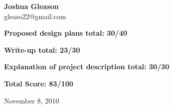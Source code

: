 \begin{titlepage}
\begin{center}



  \vspace*{0.2\textheight}

  { \large \bfseries Joshua Gleason}\\
  { \large gleaso22@gmail.com}\\

\vspace*{\fill}

{\bf Proposed design plans total: 30/40}

\hspace{20pt}

{\bf Write-up total:  23/30}

\vspace{20pt}

{\bf Explanation of project description total: 30/30}

\vspace{20pt}

{\bf {\LARGE Total Score: 83/100}}
  
\vspace*{\fill}

{\large November 8, 2010}

\end{center}

\end{titlepage}

